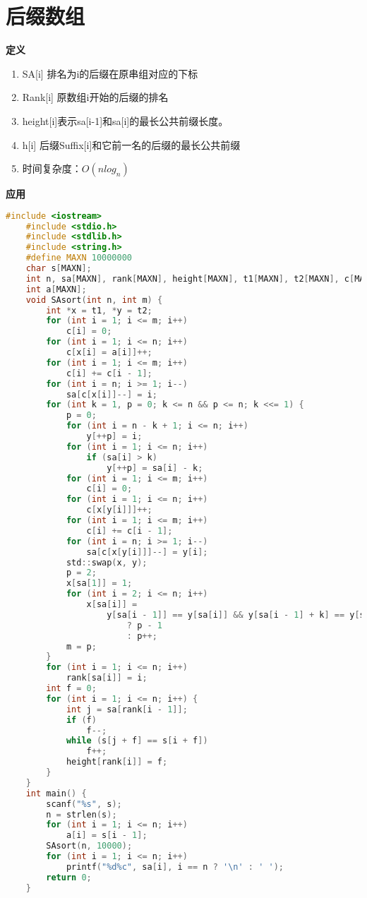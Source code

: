 \documentclass[]{article}
\begin{document}
\section{后缀数组}

\Large{\textbf{定义}}
\normalsize

\begin{enumerate}
    \item SA[i] 排名为i的后缀在原串组对应的下标
    \item Rank[i] 原数组i开始的后缀的排名
    \item height[i]表示sa[i-1]和sa[i]的最长公共前缀长度。
    \item h[i] 后缀Suffix[i]和它前一名的后缀的最长公共前缀
    \item 时间复杂度：$O(nlog_n)$
\end{enumerate}

\Large{\textbf{应用}}
\normalsize


\begin{lstlisting}[language={c}]
    #include <iostream>
    #include <stdio.h>
    #include <stdlib.h>
    #include <string.h>
    #define MAXN 10000000
    char s[MAXN];
    int n, sa[MAXN], rank[MAXN], height[MAXN], t1[MAXN], t2[MAXN], c[MAXN];
    int a[MAXN];
    void SAsort(int n, int m) {
        int *x = t1, *y = t2;
        for (int i = 1; i <= m; i++)
            c[i] = 0;
        for (int i = 1; i <= n; i++)
            c[x[i] = a[i]]++;
        for (int i = 1; i <= m; i++)
            c[i] += c[i - 1];
        for (int i = n; i >= 1; i--)
            sa[c[x[i]]--] = i;
        for (int k = 1, p = 0; k <= n && p <= n; k <<= 1) {
            p = 0;
            for (int i = n - k + 1; i <= n; i++)
                y[++p] = i;
            for (int i = 1; i <= n; i++)
                if (sa[i] > k)
                    y[++p] = sa[i] - k;
            for (int i = 1; i <= m; i++)
                c[i] = 0;
            for (int i = 1; i <= n; i++)
                c[x[y[i]]]++;
            for (int i = 1; i <= m; i++)
                c[i] += c[i - 1];
            for (int i = n; i >= 1; i--)
                sa[c[x[y[i]]]--] = y[i];
            std::swap(x, y);
            p = 2;
            x[sa[1]] = 1;
            for (int i = 2; i <= n; i++)
                x[sa[i]] =
                    y[sa[i - 1]] == y[sa[i]] && y[sa[i - 1] + k] == y[sa[i] + k]
                        ? p - 1
                        : p++;
            m = p;
        }
        for (int i = 1; i <= n; i++)
            rank[sa[i]] = i;
        int f = 0;
        for (int i = 1; i <= n; i++) {
            int j = sa[rank[i - 1]];
            if (f)
                f--;
            while (s[j + f] == s[i + f])
                f++;
            height[rank[i]] = f;
        }
    }
    int main() {
        scanf("%s", s);
        n = strlen(s);
        for (int i = 1; i <= n; i++)
            a[i] = s[i - 1];
        SAsort(n, 10000);
        for (int i = 1; i <= n; i++)
            printf("%d%c", sa[i], i == n ? '\n' : ' ');
        return 0;
    }
\end{lstlisting}
\end{document}
